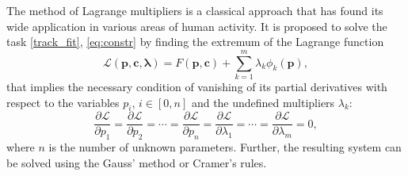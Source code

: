 %

The method of Lagrange multipliers is a classical approach that has found its wide application in various areas of human activity.
It is proposed to solve the task \eqref{track_fit}, \eqref{eq:constr} by finding the extremum of the Lagrange function
\begin{equation}
\label{lagr}
\mathcal{L}(\boldsymbol{p}, \boldsymbol{c}, \boldsymbol{\lambda}) = F(\boldsymbol{p}, \boldsymbol{c}) + \sum_{k=1}^{m} \lambda_k \phi_k(\boldsymbol{p}),
\end{equation}
that implies the necessary condition of vanishing of its partial derivatives with respect to the variables $p_i$, $i \in [0, n]$ and the undefined multipliers $\lambda_k$:
\[\frac{\partial \mathcal{L}}{\partial p_1} = \frac{\partial \mathcal{L}}{\partial p_2} = \cdots = \frac{\partial \mathcal{L}}{\partial p_{n}} = \frac{\partial \mathcal{L}}{\partial \lambda_1} = \cdots = \frac{\partial \mathcal{L}}{\partial \lambda_{m}} = 0,\]
where $n$ is the number of unknown parameters.
Further, the resulting system can be solved using the Gauss' method or Cramer's rules.
